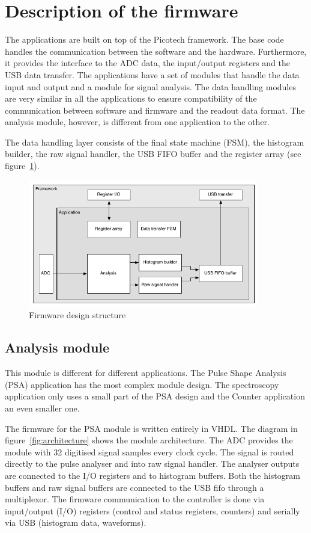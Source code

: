 \documentclass[12pt]{mytustyle}  %
\begin{document}
\section{Description of the firmware}
The applications are built on top of the Picotech framework. The base code handles the communication between the software and the hardware. Furthermore, it provides the interface to the ADC data, the input/output registers and the USB data transfer. The applications have a set of modules that handle the data input and output and a module for signal analysis. The data handling modules are very similar in all the applications to ensure compatibility of the communication between software and firmware and the readout data format. The analysis module, however, is different from one application to the other. 

The data handling layer consists of the final state machine (FSM), the histogram builder, the raw signal handler, the USB FIFO buffer and the register array (see figure~\ref{fig:application}). 


\begin{figure}[!t]
\centering
\includegraphics[width=0.9\textwidth]{plots/application}
\caption{Firmware design structure}
\label{fig:application}
\end{figure}


\subsection{Analysis module}
\label{subsec:algorithm}
This module is different for different applications. The Pulse Shape Analysis (PSA) application has the most complex module design. The spectroscopy application only uses a small part of the PSA design and the Counter application an even smaller one.

The firmware for the PSA module is written entirely in VHDL. The diagram in figure~\ref{fig:architecture} shows the module architecture. The ADC provides the module with 32 digitised signal samples every clock cycle. The signal is routed directly to the pulse analyser and into raw signal handler. The analyser outputs are connected to the I/O registers and to histogram buffers. Both the histogram buffers and raw signal buffers are connected to the USB fifo through a multiplexor. The firmware communication to the controller is done via input/output (I/O) registers (control and status registers, counters) and serially via USB (histogram data, waveforms). 
\end{document}
